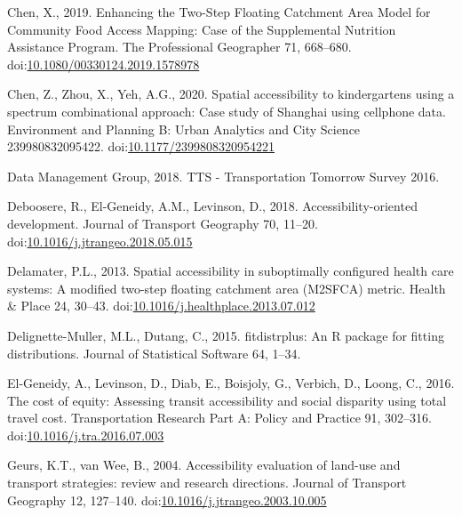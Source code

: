 \documentclass[]{elsarticle} %
\newlength{\cslhangindent}
\newlength{\cslentryspacingunit} %
\newenvironment{CSLReferences}[2] %
 {%
  \setlength{\parindent}{0pt}
  \ifodd #1
  \let\oldpar\par
  \def\par{\hangindent=\cslhangindent\oldpar}
  \fi
  \setlength{\parskip}{#2\cslentryspacingunit}
 }%
 {}
\begin{document}
\begin{CSLReferences}{1}{0}
\leavevmode{}%
Chen, X., 2019. Enhancing the {Two}-{Step} {Floating} {Catchment} {Area}
{Model} for {Community} {Food} {Access} {Mapping}: {Case} of the
{Supplemental} {Nutrition} {Assistance} {Program}. The Professional
Geographer 71, 668--680.
doi:\href{https://doi.org/10.1080/00330124.2019.1578978}{10.1080/00330124.2019.1578978}

\leavevmode{}%
Chen, Z., Zhou, X., Yeh, A.G., 2020. Spatial accessibility to
kindergartens using a spectrum combinational approach: {Case} study of
{Shanghai} using cellphone data. Environment and Planning B: Urban
Analytics and City Science 239980832095422.
doi:\href{https://doi.org/10.1177/2399808320954221}{10.1177/2399808320954221}

\leavevmode{}%
Data Management Group, 2018. {TTS} - {Transportation} {Tomorrow}
{Survey} 2016.

\leavevmode{}%
Deboosere, R., El-Geneidy, A.M., Levinson, D., 2018.
Accessibility-oriented development. Journal of Transport Geography 70,
11--20.
doi:\href{https://doi.org/10.1016/j.jtrangeo.2018.05.015}{10.1016/j.jtrangeo.2018.05.015}

\leavevmode{}%
Delamater, P.L., 2013. Spatial accessibility in suboptimally configured
health care systems: A modified two-step floating catchment area
(M2SFCA) metric. Health \& Place 24, 30--43.
doi:\href{https://doi.org/10.1016/j.healthplace.2013.07.012}{10.1016/j.healthplace.2013.07.012}

\leavevmode{}%
Delignette-Muller, M.L., Dutang, C., 2015. {fitdistrplus}: An {R}
package for fitting distributions. Journal of Statistical Software 64,
1--34.

\leavevmode{}%
El-Geneidy, A., Levinson, D., Diab, E., Boisjoly, G., Verbich, D.,
Loong, C., 2016. The cost of equity: {Assessing} transit accessibility
and social disparity using total travel cost. Transportation Research
Part A: Policy and Practice 91, 302--316.
doi:\href{https://doi.org/10.1016/j.tra.2016.07.003}{10.1016/j.tra.2016.07.003}

\leavevmode{}%
Geurs, K.T., van Wee, B., 2004. Accessibility evaluation of land-use and
transport strategies: review and research directions. Journal of
Transport Geography 12, 127--140.
doi:\href{https://doi.org/10.1016/j.jtrangeo.2003.10.005}{10.1016/j.jtrangeo.2003.10.005}


\end{CSLReferences}
\end{document}
